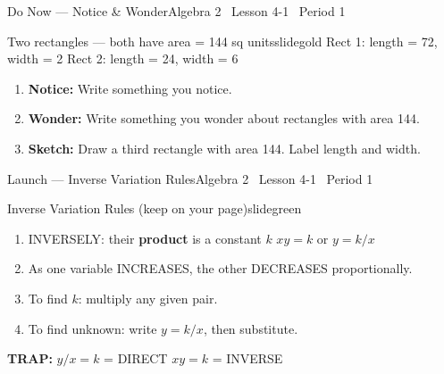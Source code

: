 \documentclass[aspectratio=169, 11pt]{beamer}
\begin{document}

\begin{frame}{Do Now --- Notice \& Wonder}{Algebra 2 \textperiodcentered\ Lesson 4-1 \textperiodcentered\ Period 1}
\vspace{0.1cm}
\begin{projcard}{Two rectangles --- both have area = 144 sq units}{slidegold}
\small
Rect 1: length = 72, width = 2 \hspace{2em} Rect 2: length = 24, width = 6

\vspace{0.15cm}
\begin{enumerate}
  \setlength{\itemsep}{1pt}
  \item \textbf{Notice:} Write something you notice.
  \item \textbf{Wonder:} Write something you wonder about rectangles with area 144.
  \item \textbf{Sketch:} Draw a third rectangle with area 144. Label length and width.
\end{enumerate}
\end{projcard}
\end{frame}

\begin{frame}{Launch --- Inverse Variation Rules}{Algebra 2 \textperiodcentered\ Lesson 4-1 \textperiodcentered\ Period 1}
\vspace{0.1cm}
\begin{projcard}{Inverse Variation Rules (keep on your page)}{slidegreen}
\small
\begin{enumerate}
  \setlength{\itemsep}{1pt}
  \item INVERSELY: their \textbf{product} is a constant \(k\) \hspace{1em} \(xy = k\) \hspace{0.5em} or \hspace{0.5em} \(y = k/x\)
  \item As one variable INCREASES, the other DECREASES proportionally.
  \item To find \(k\): multiply any given pair.
  \item To find unknown: write \(y = k/x\), then substitute.
\end{enumerate}
\vspace{0.1cm}
\textcolor{slideaccent}{\textbf{TRAP:}} \(y/x = k\) = DIRECT \hspace{2em} \(xy = k\) = INVERSE
\end{projcard}
\end{frame}
\end{document}

